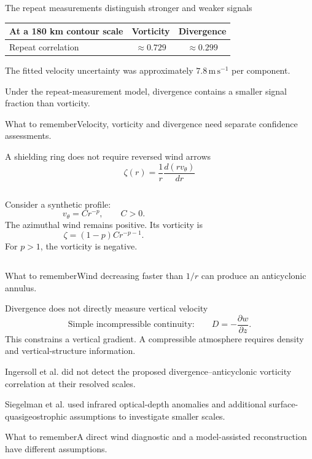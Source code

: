 \documentclass[aspectratio=169,11pt]{beamer}
\newcommand{\prov}{}
\newcommand{\evidence}[1]{\gdef\prov{#1}}
\newcommand{\takeaway}[1]{\vspace{0.3em}\begin{block}{What to remember}#1\end{block}}
\newcommand{\ms}{\mathrm{m\,s^{-1}}}
\begin{document}
\evidence{Reported numbers: Ingersoll et al., Table 1 and Methods; interpretation qualified by the error model.}
\begin{frame}{The repeat measurements distinguish stronger and weaker signals}
 \begin{center}
 \begin{tabular}{@{}lcc@{}}
 \toprule
 At a 180 km contour scale & Vorticity & Divergence\\
 \midrule
 Repeat correlation & $\approx0.729$ & $\approx0.299$\\
 \bottomrule
 \end{tabular}
 \end{center}
 \vspace{0.5cm}
 The fitted velocity uncertainty was approximately $7.8\,\ms$ per component.
 \par\medskip
 Under the repeat-measurement model, divergence contains a smaller signal
 fraction than vorticity.
 \takeaway{Velocity, vorticity and divergence need separate confidence assessments.}
\end{frame}

\evidence{Original axisymmetric derivation; the paper reports evidence for anticyclonic shielding.}
\begin{frame}{A shielding ring does not require reversed wind arrows}
 \[\zeta(r)=\frac{1}{r}\frac{d\left(rv_\theta\right)}{dr}\]
 \begin{columns}[T]
 Consider a synthetic profile:
 \[v_\theta=Cr^{-p},\qquad C>0.\]
 The azimuthal wind remains positive.
 Its vorticity is
 \[\zeta=(1-p)Cr^{-p-1}.\]
 For $p>1$, the vorticity is negative.
 \end{columns}
 \takeaway{Wind decreasing faster than $1/r$ can produce an anticyclonic annulus.}
\end{frame}

\evidence{Publication distinction: Ingersoll et al. (2022); Siegelman et al. (2022), Nature Physics, doi:10.1038/s41567-021-01458-y.}
\begin{frame}{Divergence does not directly measure vertical velocity}
 \[
 \text{Simple incompressible continuity:}\qquad
 D=-\frac{\partial w}{\partial z}.
 \]
 This constrains a vertical gradient. A compressible atmosphere requires
 density and vertical-structure information.
 \par\medskip
 Ingersoll et al. did not detect the proposed divergence--anticyclonic
 vorticity correlation at their resolved scales.
 \par\medskip
 Siegelman et al. used infrared optical-depth anomalies and additional
 surface-quasigeostrophic assumptions to investigate smaller scales.
 \takeaway{A direct wind diagnostic and a model-assisted reconstruction have different assumptions.}
\end{frame}
\end{document}

